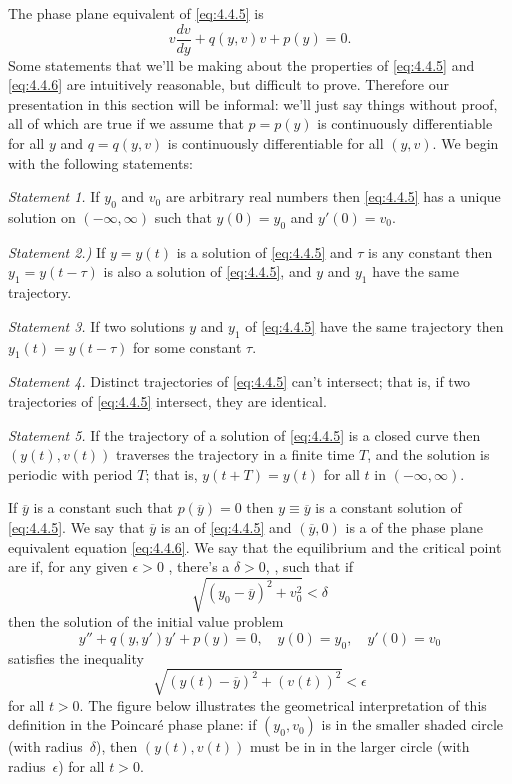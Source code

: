 \documentclass{ximera}
\begin{document}
The phase plane equivalent of \eqref{eq:4.4.5} is
\begin{equation} \label{eq:4.4.6}
v\frac{dv}{dy}+q(y,v)v+p(y)=0.
\end{equation}
Some  statements that we'll be making about the properties of
\eqref{eq:4.4.5} and \eqref{eq:4.4.6} are intuitively reasonable, but
difficult to prove.
Therefore our presentation in this section will be informal: we'll
just say things without proof, all of which are true if we assume that
$p=p(y)$ is continuously differentiable for all $y$ and $q=q(y,v)$ is
continuously differentiable for all $(y,v)$.
 We begin with the following statements:

\begin{fact}
\textit{Statement 1.} If $y_0$ and $v_0$ are arbitrary real numbers then
\eqref{eq:4.4.5} has a unique solution on $(-\infty,\infty)$ such that
$y(0)=y_0$ and $y'(0)=v_0$.

\textit{Statement 2.)} If $y=y(t)$ is a solution of \eqref{eq:4.4.5}
and
$\tau$ is any constant then $y_1=y(t-\tau)$ is also a solution of
\eqref{eq:4.4.5}, and $y$ and $y_1$ have the same trajectory.

\textit{Statement 3.}   If two solutions $y$ and $y_1$ of
\eqref{eq:4.4.5} have the same trajectory then  $y_1(t)=y(t-\tau)$
for some constant $\tau$.

\textit{Statement 4.} Distinct trajectories of \eqref{eq:4.4.5} can't
intersect; that is, if two trajectories of \eqref{eq:4.4.5}
intersect,  they are identical.


\textit{Statement 5.} If the trajectory of a solution of
\eqref{eq:4.4.5}
is a closed curve then  $(y(t),v(t))$ traverses the
trajectory in a finite time $T$, and the solution is periodic with
period $T$; that is, $y(t+T)=y(t)$ for all $t$ in $(-\infty,\infty)$.
\end{fact}


If $\overline{y}$ is a constant such that $p(\overline{y})=0$ then
$y\equiv\overline{y}$ is a constant solution of \eqref{eq:4.4.5}. We say
that $\overline{y}$ is an  of \eqref{eq:4.4.5} and
 $(\overline{y},0)$ is a  of the phase plane
equivalent equation \eqref{eq:4.4.6}. We say that the equilibrium and
the critical point are  if, for any given $\epsilon>0$
, there's a $\delta>0$,
, such that if
$$
\sqrt{(y_0-\overline{y})^2+v_0^2}<\delta
$$
then the  solution of the initial value problem
$$
y''+q(y,y')y'+p(y)=0,\quad y(0)=y_0,\quad y'(0)=v_0
$$
satisfies the inequality
$$
\sqrt{(y(t)-\overline{y})^2+(v(t))^2}<\epsilon
$$
for all $t>0$. The figure below illustrates the geometrical
interpretation of this definition in the Poincar\'e phase plane: if
$(y_0,v_0)$ is in the smaller shaded circle (with radius~$\delta$), then
$(y(t),v(t))$ must be in in the larger circle (with
radius~$\epsilon$) for all $t>0$.
\end{document}
